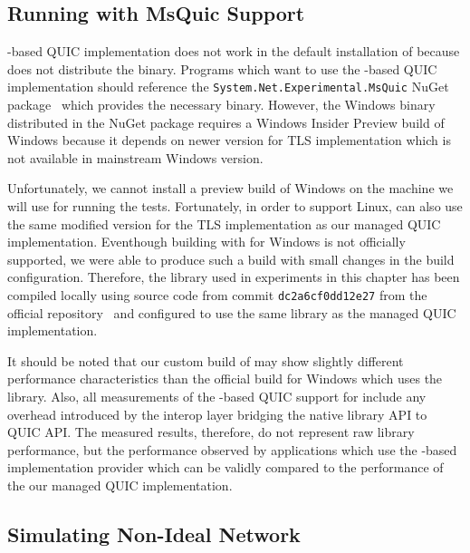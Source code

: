 \subsection{Running with MsQuic Support}

\libmsquic{}-based QUIC implementation does not work in the default installation of \dotnet{}
because \dotnet{} does not distribute the \libmsquic{} binary. Programs which want to use the
\libmsquic{}-based QUIC implementation should reference the \texttt{System.Net.Experimental.MsQuic}
NuGet package~\cite{SystemNetQuicExperimentalMsquic} which provides the necessary \libmsquic{}
binary. However, the Windows \libmsquic{} binary distributed in the NuGet package requires a Windows
Insider Preview build of Windows because it depends on newer \libschannel{} version for TLS
implementation which is not available in mainstream Windows version.

Unfortunately, we cannot install a preview build of Windows on the machine we will use for running
the tests. Fortunately, in order to support Linux, \libmsquic{} can also use the same modified
\libopenssl{} version for the TLS implementation as our managed QUIC implementation. Eventhough
building \libmsquic{} with \libopenssl{} for Windows is not officially supported, we were able to
produce such a build with small changes in the \libmsquic{} build configuration. Therefore, the
\libmsquic{} library used in experiments in this chapter has been compiled locally using source code
from commit \texttt{dc2a6cf0dd12e27} from the official \libmsquic{} repository~\cite{msquicGithub}
and configured to use the same \libopenssl{} library as the managed QUIC implementation.

It should be noted that our custom build of \libmsquic{} may show slightly different performance
characteristics than the official build for Windows which uses the \libschannel{} library. Also, all
measurements of the \libmsquic{}-based QUIC support for \dotnet{} include any overhead introduced by
the interop layer bridging the native library API to \dotnet{} QUIC API\@. The measured results,
therefore, do not represent raw \libmsquic{} library performance, but the performance observed by
\dotnet{} applications which use the \libmsquic{}-based implementation provider which can be validly
compared to the performance of the our managed QUIC implementation.

\subsection{Simulating Non-Ideal Network}

